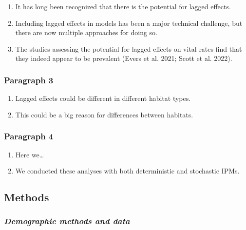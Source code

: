 \documentclass[
]{article}
\providecommand{\tightlist}{%
  \setlength{\itemsep}{0pt}\setlength{\parskip}{0pt}}\usepackage{longtable,booktabs,array}
\begin{document}
\begin{enumerate}
\def\labelenumi{\arabic{enumi}.}
\tightlist
\item
  It has long been recognized that there is the potential for lagged
  effects.
\item
  Including lagged effects in models has been a major technical
  challenge, but there are now multiple approaches for doing so.
\item
  The studies assessing the potential for lagged effects on vital rates
  find that they indeed appear to be prevalent (Evers et al. 2021; Scott
  et al. 2022).
\end{enumerate}

\hypertarget{paragraph-3}{%
\subsubsection{\texorpdfstring{\textbf{Paragraph
3}}{Paragraph 3}}\label{paragraph-3}}

\begin{enumerate}
\def\labelenumi{\arabic{enumi}.}
\tightlist
\item
  Lagged effects could be different in different habitat types.
\item
  This could be a big reason for differences between habitats.
\end{enumerate}

\hypertarget{paragraph-4}{%
\subsubsection{\texorpdfstring{\textbf{Paragraph
4}}{Paragraph 4}}\label{paragraph-4}}

\begin{enumerate}
\def\labelenumi{\arabic{enumi}.}
\tightlist
\item
  Here we\ldots{}
\item
  We conducted these analyses with both deterministic and stochastic
  IPMs.
\end{enumerate}

\hypertarget{methods}{%
\subsection{Methods}\label{methods}}

\hypertarget{demographic-methods-and-data}{%
\subsubsection{\texorpdfstring{\emph{Demographic methods and
data}}{Demographic methods and data}}\label{demographic-methods-and-data}}
\end{document}
